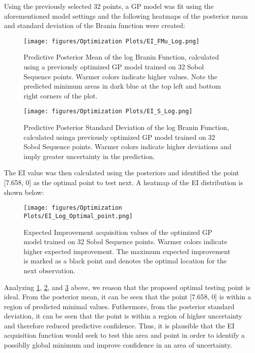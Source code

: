 \documentclass[11pt]{article}
\numberwithin{equation}{section}
\begin{document}
Using the previously selected 32 points, a GP model was fit using the aforementioned model settings and the following heatmaps of the posterior mean and standard deviation of the Branin function were created:

\begin{figure}[H]
  \centering
  \texttt{[image: figures/Optimization Plots/EI\_FMu\_Log.png]}
  \caption{Predictive Posterior Mean of the log Branin Function, calculated using a previously optimized GP model trained on 32 Sobol Sequence points. 
  Warmer colors indicate higher values. Note the predicted minimum areas in dark blue at the top left and bottom right corners of the plot.}
  \label{fig:ei-fmu-log}
\end{figure}

\begin{figure}[H]
  \centering
  \texttt{[image: figures/Optimization Plots/EI\_S\_Log.png]}
  \caption{Predictive Posterior Standard Deviation of the log Branin Function, calculated usinga previously optimized GP model trained on 32 Sobol Sequence points. 
  Warmer colors indicate higher deviations and imply greater uncertainty in the prediction.}
  \label{fig:ei-fs-log}
\end{figure}

The EI value was then calculated using the posteriors and identified the point [7.658, 0] as the optimal point to test next. 
A heatmap of the EI distribution is shown below:

\begin{figure}[H]
  \centering
  \texttt{[image: figures/Optimization Plots/EI\_Log\_Optimal\_point.png]}
  \caption{Expected Improvement acquisition values of the optimized GP model trained on 32 Sobol Sequence points. Warmer colors indicate higher expected improvement. 
  The maximum expected improvement is marked as a black point and denotes the optimal location for the next observation.}
  \label{fig:ei-optimalPoint-log}
\end{figure}

Analyzing \ref{fig:ei-fmu-log}, \ref{fig:ei-fs-log}, and \ref{fig:ei-optimalPoint-log} above, we reason that the proposed optimal testing point is ideal. 
From the posterior mean, it can be seen that the point [7.658, 0] is within a region of predicted minimal values.
Futhermore, from the posterior standard deviation, it can be seen that the point is within a region of higher uncertainty and therefore reduced predictive confidence.
Thus, it is plausible that the EI acquisition function would seek to test this area and point in order to identify a possiblly global minimum and improve confidence in an area of uncertainty. 
\end{document}
